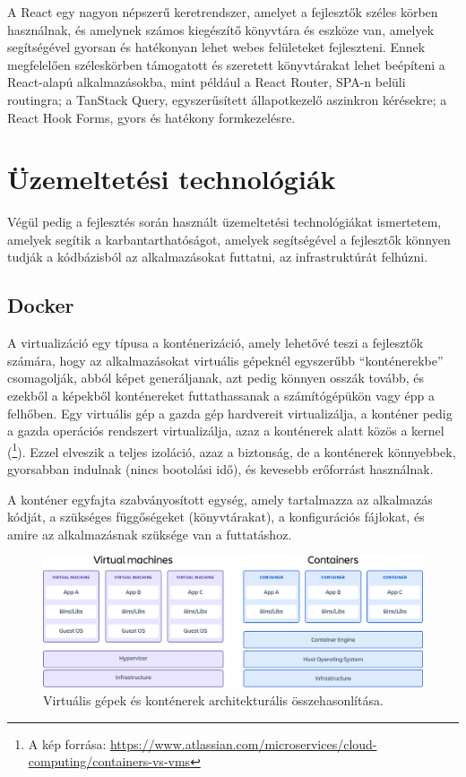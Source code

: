 A React egy nagyon népszerű keretrendszer, amelyet a fejlesztők széles körben használnak, és amelynek számos kiegészítő könyvtára és eszköze van, amelyek segítségével gyorsan és hatékonyan lehet webes felületeket fejleszteni. Ennek megfelelően széleskörben támogatott és szeretett könyvtárakat lehet beépíteni a React-alapú alkalmazásokba, mint például a React Router, SPA-n belüli routingra; a TanStack Query, egyszerűsített állapotkezelő aszinkron kérésekre; a React Hook Forms, gyors és hatékony formkezelésre.

\section{Üzemeltetési technológiák}

Végül pedig a fejlesztés során használt üzemeltetési technológiákat ismertetem, amelyek segítik a karbantarthatóságot, amelyek segítségével a fejlesztők könnyen tudják a kódbázisból az alkalmazásokat futtatni, az infrastruktúrát felhúzni.

\subsection{Docker}

A virtualizáció egy típusa a konténerizáció, amely lehetővé teszi a fejlesztők számára, hogy az alkalmazásokat virtuális gépeknél egyszerűbb ``konténerekbe'' csomagolják, abból képet generáljanak, azt pedig könnyen osszák tovább, és ezekből a képekből konténereket futtathassanak a számítógépükön vagy épp a felhőben. Egy virtuális gép a gazda gép hardvereit virtualizálja, a konténer pedig a gazda operációs rendszert virtualizálja, azaz a konténerek alatt közös a kernel (\footnote{A kép forrása: \url{https://www.atlassian.com/microservices/cloud-computing/containers-vs-vms}}). Ezzel elveszik a teljes izoláció, azaz a biztonság, de a konténerek könnyebbek, gyorsabban indulnak (nincs bootolási idő), és kevesebb erőforrást használnak. 

A konténer egyfajta szabványosított egység, amely tartalmazza az alkalmazás kódját, a szükséges függőségeket (könyvtárakat), a konfigurációs fájlokat, és amire az alkalmazásnak szüksége van a futtatáshoz.

\begin{figure}[ht]
	\centering
	\includegraphics[width=120mm, keepaspectratio]{figures/virtudocker.png}
	\caption{Virtuális gépek és konténerek architekturális összehasonlítása.}
	\label{fig:virtudocker}
\end{figure}

